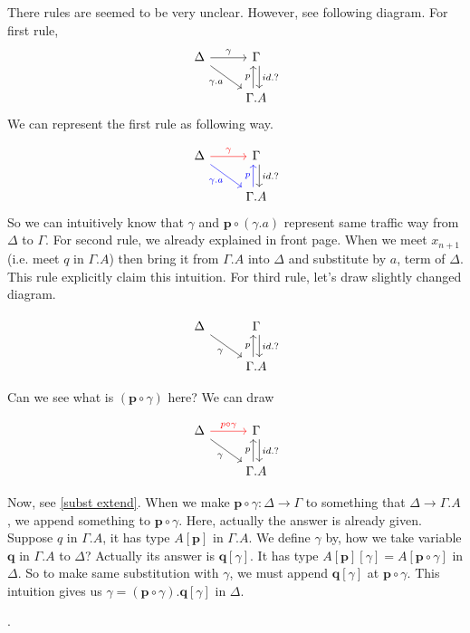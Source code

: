 \documentclass[12pt, a4paper, openany, twoside]{book}
\theoremstyle{definition}
\theoremstyle{remark}
\theoremstyle{plain}
\numberwithin{equation}{section}
\begin{document}
There rules are seemed to be very unclear. However, see following diagram. For first rule, 
\[
\begin{tikzcd}
    \Delta \arrow[r, "\gamma"] \arrow[rd, "\gamma.a"'] & \Gamma \arrow[d, "id.?", shift left]\\
    & \Gamma.A \arrow[u, "p", shift left]
\end{tikzcd}
\]
We can represent the first rule as following way. 

\[
\begin{tikzcd}
    \Delta \arrow[r, "\gamma", red] \arrow[rd, "\gamma.a"', blue] & \Gamma \arrow[d, "id.?", shift left]\\
    & \Gamma.A \arrow[u, "p", shift left, blue]
\end{tikzcd}
\]
So we can intuitively know that $\gamma$ and $\mathbf{p} \circ (\gamma.a)$ represent same traffic way from $\Delta$ to $\Gamma$. 
For second rule, we already explained in front page. When we meet $x_{n+1}$ (i.e. meet $q$ in $\Gamma.A$) 
then bring it from $\Gamma.A$ into $\Delta$ and substitute by $a$, term of $\Delta$. This rule explicitly claim this intuition. 
For third rule, let's draw slightly changed diagram. 

\[
\begin{tikzcd}
    \Delta  \arrow[rd, "\gamma"'] & \Gamma \arrow[d, "id.?", shift left]\\
    & \Gamma.A \arrow[u, "p", shift left]
\end{tikzcd}
\]

Can we see what is $(\mathbf{p} \circ \gamma)$ here? We can draw 

\[
\begin{tikzcd}
    \Delta \arrow[r, "p\circ \gamma", red] \arrow[rd, "\gamma"'] & \Gamma \arrow[d, "id.?", shift left]\\
    & \Gamma.A \arrow[u, "p", shift left]
\end{tikzcd}
\]

Now, see \ref{subst extend}. When we make $\mathbf{p} \circ \gamma : \Delta \rightarrow \Gamma$ to something that $\Delta \rightarrow \Gamma.A$, 
we append something to $\mathbf{p} \circ \gamma$. Here, actually the answer is already given. Suppose 
$q$ in $\Gamma.A$, it has type $A[\mathbf{p}]$ in $\Gamma.A$. We define $\gamma$ by, how we take variable $\mathbf{q}$ in $\Gamma.A$ to $\Delta$? 
Actually its answer is $\mathbf{q}[\gamma]$. It has type $A[\mathbf{p}][\gamma] = A[\mathbf{p} \circ \gamma]$ in $\Delta$. 
So to make same substitution with $\gamma$, we must append $\mathbf{q}[\gamma]$ at $\mathbf{p}\circ \gamma$. This intuition gives us $\gamma = (\mathbf{p}\circ \gamma).\mathbf{q}[\gamma]$ in $\Delta$. 

\newpage  
.
\end{document}
